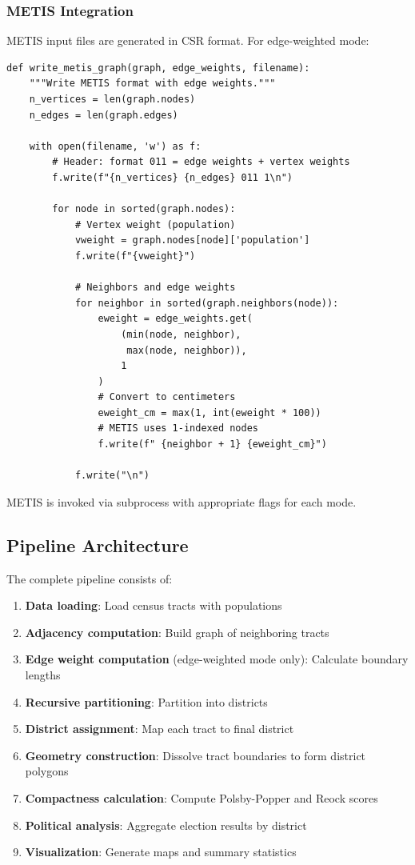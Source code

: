 \subsubsection{METIS Integration}

METIS input files are generated in CSR format. For edge-weighted mode:

\begin{verbatim}
def write_metis_graph(graph, edge_weights, filename):
    """Write METIS format with edge weights."""
    n_vertices = len(graph.nodes)
    n_edges = len(graph.edges)

    with open(filename, 'w') as f:
        # Header: format 011 = edge weights + vertex weights
        f.write(f"{n_vertices} {n_edges} 011 1\n")

        for node in sorted(graph.nodes):
            # Vertex weight (population)
            vweight = graph.nodes[node]['population']
            f.write(f"{vweight}")

            # Neighbors and edge weights
            for neighbor in sorted(graph.neighbors(node)):
                eweight = edge_weights.get(
                    (min(node, neighbor),
                     max(node, neighbor)),
                    1
                )
                # Convert to centimeters
                eweight_cm = max(1, int(eweight * 100))
                # METIS uses 1-indexed nodes
                f.write(f" {neighbor + 1} {eweight_cm}")

            f.write("\n")
\end{verbatim}

METIS is invoked via subprocess with appropriate flags for each mode.

\subsection{Pipeline Architecture}

The complete pipeline consists of:

\begin{enumerate}
\item \textbf{Data loading}: Load census tracts with populations
\item \textbf{Adjacency computation}: Build graph of neighboring tracts
\item \textbf{Edge weight computation} (edge-weighted mode only): Calculate boundary lengths
\item \textbf{Recursive partitioning}: Partition into districts
\item \textbf{District assignment}: Map each tract to final district
\item \textbf{Geometry construction}: Dissolve tract boundaries to form district polygons
\item \textbf{Compactness calculation}: Compute Polsby-Popper and Reock scores
\item \textbf{Political analysis}: Aggregate election results by district
\item \textbf{Visualization}: Generate maps and summary statistics
\end{enumerate}

